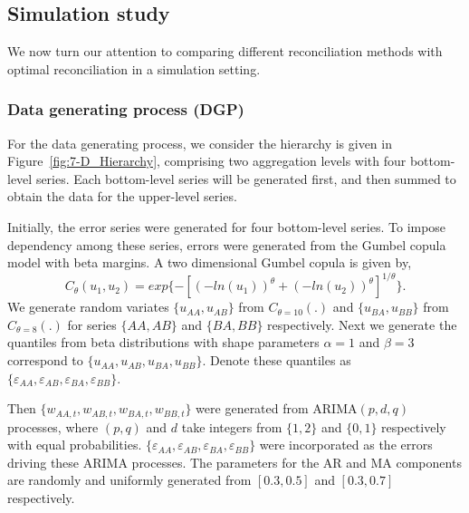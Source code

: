 \subsection{Simulation study}\label{sec:Bootsrap-sim}

We now turn our attention to comparing different reconciliation methods with optimal reconciliation in a simulation setting. 

\subsubsection{Data generating process (DGP)}
For the data generating process, we consider the hierarchy is given in Figure~\ref{fig:7-D_Hierarchy}, comprising two aggregation levels with four bottom-level series. Each bottom-level series will be generated first, and then summed to obtain the data for the upper-level series. 

Initially, the error series were generated for four bottom-level series. To impose dependency among these series, errors were generated from the Gumbel copula model with beta margins. A two dimensional Gumbel copula is given by, 
\begin{equation*}
C_\theta(u_1, u_2) = exp\{-[(-ln(u_1))^\theta + (-ln(u_2))^\theta]^{1/\theta}\}. 
\end{equation*}
We generate random variates $\{u_{AA}, u_{AB}\}$ from $C_{\theta=10}(.)$ and $\{u_{BA}, u_{BB}\}$ from $C_{\theta=8}(.)$ for series $\{AA, AB\}$ and $\{BA, BB\}$ respectively. Next we generate the quantiles from beta distributions with shape parameters $\alpha = 1$ and $\beta = 3$ correspond to $\{u_{AA}, u_{AB}, u_{BA}, u_{BB}\}$. Denote these quantiles as $\{\varepsilon_{AA}, \varepsilon_{AB}, \varepsilon_{BA}, \varepsilon_{BB}\}$. 

Then $\{w_{AA,t},w_{AB,t},w_{BA,t},w_{BB,t}\}$ were generated from ARIMA$(p,d,q)$ processes, where $(p,q)$ and $d$ take integers from $\{1,2\}$ and $\{0,1\}$ respectively with equal probabilities. $\{\varepsilon_{AA}, \varepsilon_{AB}, \varepsilon_{BA}, \varepsilon_{BB}\}$ were incorporated as the errors driving these ARIMA processes. The parameters for the AR and MA components are randomly and uniformly generated from $[0.3,0.5]$ and $[0.3,0.7]$ respectively. 


